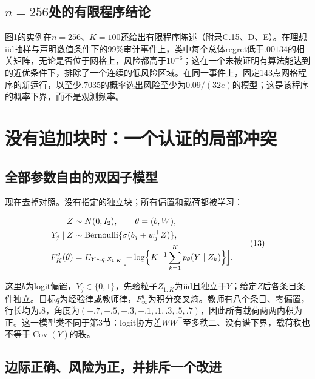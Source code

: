 \documentclass[11pt,a4paper]{article}
\begin{document}
\subsection{\texorpdfstring{\(n=256\)处的有限程序结论}{n=256处的有限程序结论}}\label{n256ux5904ux7684ux6709ux9650ux7a0bux5e8fux7ed3ux8bba}

图1的实例在\(n=256\)、\(K=100\)还给出有限程序陈述（附录C.15、D、E）。在理想iid抽样与声明数值条件下的99\%审计事件上，类中每个总体regret低于\(.00134\)的相关矩阵，无论是否位于网格上，风险都高于\(10^{-6}\)；这在一个未被证明有算法能达到的近优条件下，排除了一个连续的低风险区域。在同一事件上，固定143点网格程序的新运行，以至少\(.7035\)的概率选出风险至少为\(0.09/(32e)\)的模型；这是该程序的概率下界，而不是观测频率。

\section{没有追加块时：一个认证的局部冲突}\label{ux6ca1ux6709ux8ffdux52a0ux5757ux65f6ux4e00ux4e2aux8ba4ux8bc1ux7684ux5c40ux90e8ux51b2ux7a81}

\subsection{全部参数自由的双因子模型}\label{ux5168ux90e8ux53c2ux6570ux81eaux7531ux7684ux53ccux56e0ux5b50ux6a21ux578b}

现在去掉对照。没有指定的独立块；所有偏置和载荷都被学习：

\[
\begin{aligned}
Z&\sim N(0,I_2),\qquad \theta=(b,W),\\
Y_j\mid Z&\sim\operatorname{Bernoulli}
 \{\sigma(b_j+w_j^\top Z)\},\\
F_K^q(\theta)&=E_{Y\sim q,Z_{1:K}}\Bigl[
-\log\Bigl\{K^{-1}\sum_{k=1}^K
p_\theta(Y\mid Z_k)\Bigr\}\Bigr].
\end{aligned}
\tag{13}
\]

这里\(b\)为logit偏置，\(Y_j\in\{0,1\}\)，先验粒子\(Z_{1:K}\)为iid且独立于\(Y\)；给定\(Z\)后各条目条件独立。目标\(q\)为经验律或教师律，\(F_\infty^q\)为积分交叉熵。教师有八个条目、零偏置，行长均为\(.8\)，角度为\((-.7,-.5,-.3,-.1,.1,.3,.5,.7)\)，因此所有载荷两两内积为正。这一模型类不同于第3节：logit协方差\(WW^\top\)至多秩二、没有谱下界，载荷秩也不等于\(\operatorname{Cov}(Y)\)的秩。

\subsection{边际正确、风险为正，并排斥一个改进}\label{ux8fb9ux9645ux6b63ux786eux98ceux9669ux4e3aux6b63ux5e76ux6392ux65a5ux4e00ux4e2aux6539ux8fdb}
\end{document}
